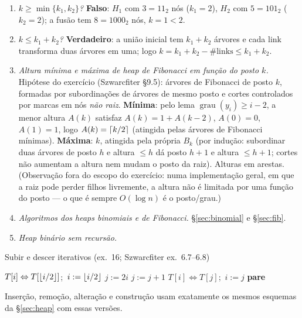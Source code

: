 \begin{enumerate}
  \item[11.] \emph{$k\ge\min\{k_1,k_2\}$?} \textbf{Falso}: $H_1$ com $3=11_2$ nós ($k_1=2$), $H_2$ com $5=101_2$ ($k_2=2$); a fusão tem $8=1000_2$ nós, $k=1<2$.
  \item[12.] \emph{$k\le k_1+k_2$?} \textbf{Verdadeiro}: a união inicial tem $k_1+k_2$ árvores e cada link transforma duas árvores em uma; logo $k=k_1+k_2-\#\text{links}\le k_1+k_2$.
  \item[13.] \emph{Altura mínima e máxima de heap de Fibonacci em função do posto $k$.} Hipótese do exercício (Szwarcfiter §9.5): árvores de Fibonacci de posto $k$, formadas por subordinações de árvores de mesmo posto e cortes controlados por marcas em nós \emph{não raiz}. \textbf{Mínima}: pelo lema $\operatorname{grau}(y_i)\ge i-2$, a menor altura $A(k)$ satisfaz $A(k)=1+A(k-2)$, $A(0)=0$, $A(1)=1$, logo \textbf{$A(k)=\lceil k/2\rceil$} (atingida pelas árvores de Fibonacci mínimas). \textbf{Máxima}: \textbf{$k$}, atingida pela própria $B_k$ (por indução: subordinar duas árvores de posto $h$ e altura $\le h$ dá posto $h+1$ e altura $\le h+1$; cortes não aumentam a altura nem mudam o posto da raiz). Alturas em arestas.
  (Observação fora do escopo do exercício: numa implementação geral, em que a raiz pode perder filhos livremente, a altura não é limitada por uma função do posto --- o que é sempre $O(\log n)$ é o posto/grau.)
  \item[14--15.] \emph{Algoritmos dos heaps binomiais e de Fibonacci.} §\ref{sec:binomial} e §\ref{sec:fib}.
  \item[16.] \emph{Heap binário sem recursão.}
\end{enumerate}
\begin{pseudo}{Subir e descer iterativos (ex.\ 16; Szwarcfiter ex.\ 6.7--6.8)}
\begin{algorithmic}
    \State $T[i]\Leftrightarrow T[\lfloor i/2\rfloor]$;\ $i:=\lfloor i/2\rfloor$
  \EndWhile
\EndProcedure
{}
    \State $j:=2i$
     \State $j:=j+1$ \EndIf
     \State $T[i]\Leftrightarrow T[j]$;\ $i:=j$
    \Else \State \textbf{pare}
    \EndIf
  \EndWhile
\EndProcedure
\end{algorithmic}
\end{pseudo}
Inserção, remoção, alteração e construção usam exatamente os mesmos esquemas da §\ref{sec:heap} com essas versões.

